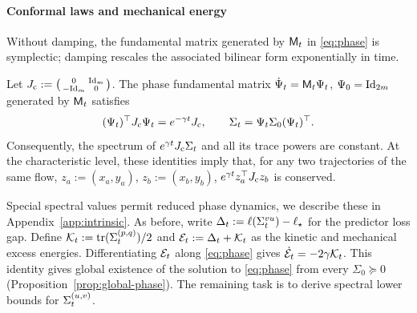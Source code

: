 \paragraph{Conformal laws and mechanical energy}
Without damping, the fundamental matrix generated by $\mathsf M_t$ in \eqref{eq:phase} is symplectic;
damping rescales the associated bilinear form exponentially in time. 
\begin{proposition}\label{prop:phase-laws}
Let $J_{\mathrm c}:=\begin{psmallmatrix}0&\mathrm{Id}_m\\-\mathrm{Id}_m&0\end{psmallmatrix}$.
The phase fundamental matrix \(\dot\Psi_t=\mathsf M_t\Psi_t\),
\(\Psi_0=\mathrm{Id}_{2m}\) generated by $\mathsf M_t$ satisfies
\[
 (\Psi_t)^\top J_{\mathrm c}\Psi_t=e^{-\gamma t}J_{\mathrm c},\qquad
 \Sigma_t=\Psi_t\Sigma_0(\Psi_t)^\top.
\]
Consequently, the spectrum of \(e^{\gamma t}J_{\mathrm c}\Sigma_t\)
and all its trace powers are constant. At the characteristic level,
these identities imply that, for any two trajectories of
the same flow, \(z_a:=(x_a,y_a)\), \(z_b:=(x_b,y_b)\),
\(e^{\gamma t}z_a^\top J_{\mathrm c} z_b\) is conserved.
\end{proposition}

Special spectral values permit reduced phase dynamics, we describe these in Appendix~\ref{app:intrinsic}.
As before, write $\Delta_t:=\ell(\Sigma^{vu}_t)-\ell_\star$ for the predictor loss gap. Define $\mathcal{K}_t:=\operatorname{tr}(\Sigma^{(p,q)}_t)/2$ and $\mathcal E_t:=\Delta_t+\mathcal{K}_t$ as the kinetic and mechanical excess energies. Differentiating $\mathcal E_t$ along \eqref{eq:phase} gives $\dot{\mathcal E}_t=-2\gamma\mathcal{K}_t$.
This identity gives global existence of the solution to \eqref{eq:phase} from every $\Sigma_0 \succeq 0$ (Proposition~\ref{prop:global-phase}).
The remaining task is to derive spectral lower bounds for $\Sigma^{(u,v)}_t$.

